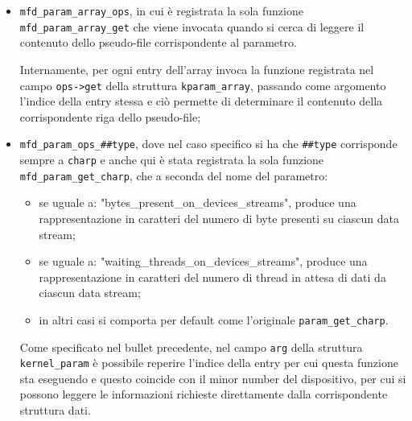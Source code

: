 \documentclass{article}
\begin{document}
\begin{itemize}
\item \texttt{mfd\_param\_array\_ops}, in cui è registrata la sola funzione \texttt{mfd\_param\_array\_get} che viene invocata quando si cerca di leggere il contenuto dello pseudo-file corrispondente al parametro.

Internamente, per ogni entry dell'array invoca la funzione registrata nel campo \texttt{ops->get} della struttura \texttt{kparam\_array}, passando come argomento l'indice della entry stessa e ciò permette di determinare il contenuto della corrispondente riga dello pseudo-file;

\item \texttt{mfd\_param\_ops\_\#\#type}, dove nel caso specifico si ha che \texttt{\#\#type} corrisponde sempre a \texttt{charp} e anche qui è stata registrata la sola funzione \texttt{mfd\_param\_get\_charp}, che a seconda del nome del parametro:
\begin{itemize}
\item se uguale a: "bytes\_present\_on\_devices\_streams", produce una rappresentazione in caratteri del numero di byte presenti su ciascun data stream;
\item se uguale a: "waiting\_threads\_on\_devices\_streams", produce una rappresentazione in caratteri del numero di thread in attesa di dati da ciascun data stream;
\item in altri casi si comporta per default come l'originale \texttt{param\_get\_charp}.
\end{itemize}
Come specificato nel bullet precedente, nel campo \texttt{arg} della struttura \texttt{kernel\_param} è possibile reperire l'indice della entry per cui questa funzione sta eseguendo e questo coincide con il minor number del dispositivo, per cui si possono leggere le informazioni richieste direttamente dalla corrispondente struttura dati.
\end{itemize}
\end{document}
